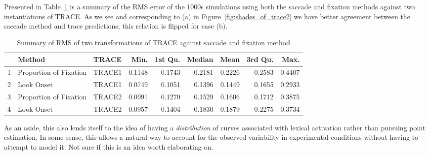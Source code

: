 
Presented in Table~\ref{tab:mise_trace} is a summary of the RMS error of the 1000s simulations using both the saccade and fixation methods against two instantiations of TRACE. As we see and corresponding to (a) in Figure~\ref{fig:shades_of_trace2} we have better agreement between the saccade method and trace predictions; this relation is flipped for case (b). 


\begin{table}[ht]
\centering
\begin{tabular}{rllrrrrrr}
  \hline
 & Method & TRACE & Min. & 1st Qu. & Median & Mean & 3rd Qu. & Max. \\ 
  \hline
1 & Proportion of Fixation & TRACE1 & 0.1148 & 0.1743 & 0.2181 & 0.2226 & 0.2583 & 0.4407 \\ 
  2 & Look Onset & TRACE1 & 0.0749 & 0.1051 & 0.1396 & 0.1449 & 0.1655 & 0.2933 \\ 
  3 & Proportion of Fixation & TRACE2 & 0.0991 & 0.1270 & 0.1529 & 0.1606 & 0.1712 & 0.3875 \\ 
  4 & Look Onset & TRACE2 & 0.0957 & 0.1404 & 0.1830 & 0.1879 & 0.2275 & 0.3734 \\ 
   \hline
\end{tabular}
\caption{Summary of RMS of two transformations of TRACE against saccade and fixation method}
\label{tab:mise_trace}
\end{table}

As an aside, this also lends itself to the idea of having a \textit{distribution} of curves associated with lexical activation rather than pursuing point estimation.  In some sense, this allows a natural way to account for the observed variability in experimental conditions without having to attempt to model it. Not sure if this is an idea worth elaborating on.


